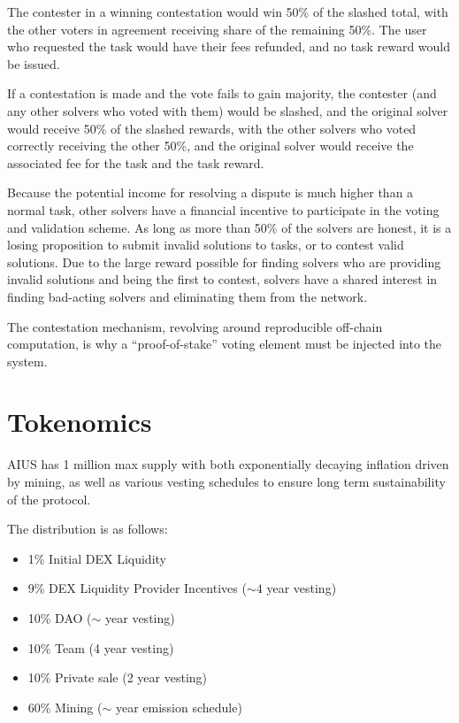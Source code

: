 \documentclass{article}
\begin{document}
The contester in a winning contestation would win 50\% of the slashed total, with the other voters in agreement receiving share of the remaining 50\%. The user who requested the task would have their fees refunded, and no task reward would be issued.

If a contestation is made and the vote fails to gain majority, the contester (and any other solvers who voted with them) would be slashed, and the original solver would receive 50\% of the slashed rewards, with the other solvers who voted correctly receiving the other 50\%, and the original solver would receive the associated fee for the task and the task reward.

Because the potential income for resolving a dispute is much higher than a normal task, other solvers have a financial incentive to participate in the voting and validation scheme. As long as more than 50\% of the solvers are honest, it is a losing proposition to submit invalid solutions to tasks, or to contest valid solutions. Due to the large reward possible for finding solvers who are providing invalid solutions and being the first to contest, solvers have a shared interest in finding bad-acting solvers and eliminating them from the network.

The contestation mechanism, revolving around reproducible off-chain computation, is why a ``proof-of-stake'' voting element must be injected into the system. 

\newpage

\section{Tokenomics}\label{tokenomics}

AIUS has 1 million max supply with both exponentially decaying inflation driven by mining, as well as various vesting schedules to ensure long term sustainability of the protocol.

The distribution is as follows:

\begin{itemize}
    \item 1\% Initial DEX Liquidity
    \item 9\% DEX Liquidity Provider Incentives ($\sim4$ year vesting)
    \item 10\% DAO ($\sim$ year vesting)
    \item 10\% Team (4 year vesting)
    \item 10\% Private sale (2 year vesting)
    \item 60\% Mining ($\sim$ year emission schedule)
\end{itemize}
\end{document}
